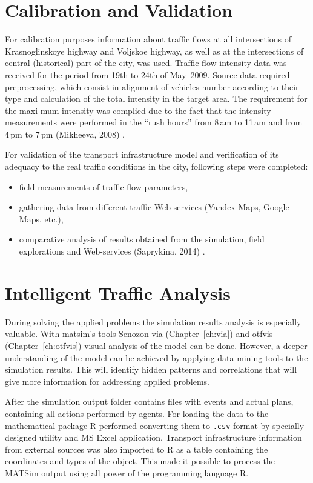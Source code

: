 \section{Calibration and Validation}
For calibration purposes information about traffic flows at all intersections of Krasnoglinskoye highway and Voljskoe highway, as well as at the intersections of central (historical) part of the city, was used. Traffic flow intensity data was received for the period from 19th to 24th of May~2009. Source data required preprocessing, which consist in alignment of vehicles number according to their type and calculation of the total intensity in the target area. The requirement for the maxi-mum intensity was complied due to the fact that the intensity measurements were performed in the ``rush hours'' from 8\,am to 11\,am and from 4\,pm to 7\,pm (Mikheeva, 2008) \citep[][]{}. 

For validation of the transport infrastructure model and verification of its adequacy to the real traffic conditions in the city, following steps were completed: 
\begin{itemize}
\item field measurements of traffic flow parameters,
\item gathering data from different traffic Web-services (Yandex Maps, Google Maps, etc.),
\item comparative analysis of results obtained from the simulation, field explorations and Web-services (Saprykina, 2014) \citep[][]{}.
\end{itemize}

\section{Intelligent Traffic Analysis}
During solving the applied problems the simulation results analysis is especially valuable. 
With \gls{matsim}'s tools Senozon \gls{via} (Chapter~\ref{ch:via}) and \gls{otfvis} (Chapter~\ref{ch:otfvis}) visual analysis of the model can be done. 
However, a deeper understanding of the model can be achieved by applying data mining tools to the simulation results. 
This will identify hidden patterns and correlations that will give more information for addressing applied problems. 

After the simulation output folder contains files with events and actual plans, containing all actions performed by agents. For loading the data to the mathematical package R performed converting them to \lstinline|.csv| format by specially designed utility and MS Excel application. Transport infrastructure information from external sources was also imported to R as a table containing the coordinates and types of the object. This made it possible to process the MATSim output using all power of the programming language R.

